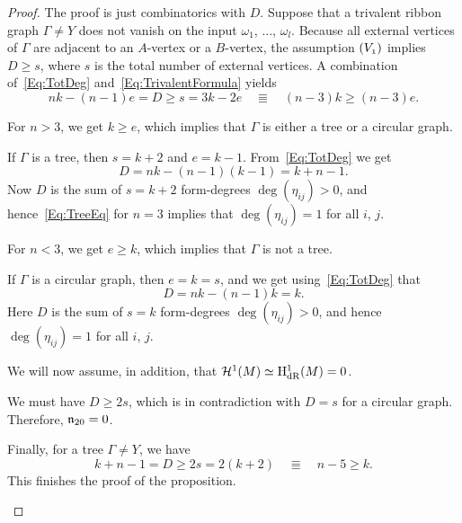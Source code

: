 \documentclass[\MainFolder/Text.tex]{subfiles}
\begin{document}
\begin{proof}
The proof is just combinatorics with $D$. Suppose that a trivalent ribbon graph $\Gamma\neq Y$ does not vanish on the input $\omega_1$, $\dotsc$, $\omega_l$. Because all external vertices of $\Gamma$ are adjacent to an $A$-vertex or a $B$-vertex, the assumption $(V_{\NOne})$ implies $D\ge s$, where $s$ is the total number of external vertices. A combination of~\eqref{Eq:TotDeg} and~\eqref{Eq:TrivalentFormula} yields
$$ nk - (n-1)e = D \ge s = 3k - 2e\quad\Equiv\quad(n-3)k \ge (n-3)e. $$
\begin{ProofList}[label=(\alph*)]
\item For $n>3$, we get $k \ge e$, which implies that $\Gamma$ is either a tree or a circular graph.
\item If $\Gamma$ is a tree, then $s = k + 2$ and $e = k-1$. From~\eqref{Eq:TotDeg} we get
\begin{equation} \label{Eq:TreeEq}
D = nk - (n-1)(k-1) = k+n-1.  
\end{equation}
Now $D$ is the sum of $s=k+2$ form-degrees $\deg(\eta_{ij})>0$, and hence~\eqref{Eq:TreeEq} for $n=3$ implies that $\deg(\eta_{ij}) = 1$ for all $i$, $j$.
\item For $n<3$, we get $e \ge k$, which implies that $\Gamma$ is not a tree.
\item If $\Gamma$ is a circular graph, then $e=k=s$, and we get using~\eqref{Eq:TotDeg} that
$$ D = nk - (n-1)k = k. $$
Here $D$ is the sum of $s=k$ form-degrees $\deg(\eta_{ij})>0$, and hence $\deg(\eta_{ij})=1$ for all $i$, $j$.
\end{ProofList}
We will now assume, in addition, that $\mathcal{H}^1(M) \simeq \mathrm{H}_{\mathrm{dR}}^1(M) = 0$.
\begin{ProofList}[resume, label=(\alph*)]
\item We must have $D\ge 2 s$, which is in contradiction with $D = s$ for a circular graph. Therefore, $\mathfrak{n}_{20} = 0$.
\item Finally, for a tree $\Gamma \neq Y$, we have
\begin{equation*}
 k+n-1 = D \ge 2 s = 2(k + 2)\quad\Equiv\quad  n-5 \ge k. \end{equation*}
This finishes the proof of the proposition.\qedhere
\end{ProofList}
\end{proof}

\end{document}

